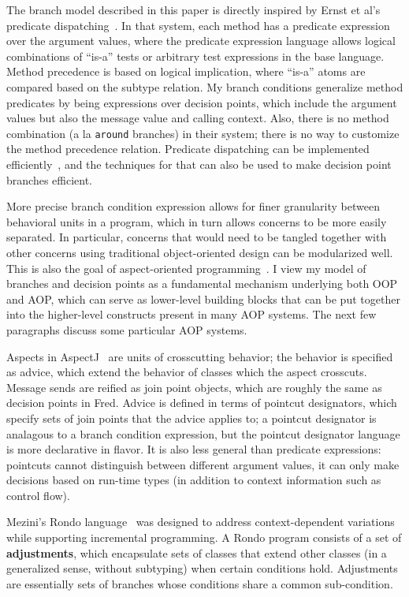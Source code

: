 \documentclass{article}
\newcommand{\defn}[1]{\textbf{#1}}
\newcommand{\code}[1]{\texttt{#1}}
\begin{document}
The branch model described in this paper is directly inspired by Ernst
et al's predicate dispatching~\cite{predicate-dispatch}.  In that
system, each method has a predicate expression over the argument
values, where the predicate expression language allows logical
combinations of ``is-a'' tests or arbitrary test expressions in the
base language.  Method precedence is based on logical implication,
where ``is-a'' atoms are compared based on the subtype relation.  My
branch conditions generalize method predicates by being expressions
over decision points, which include the argument values but also the
message value and calling context.  Also, there is no method
combination (a la \code{around} branches) in their system; there is no
way to customize the method precedence relation.  Predicate
dispatching can be implemented efficiently~\cite{efficient-pd}, and
the techniques for that can also be used to make decision point
branches efficient.

More precise branch condition expression allows for finer granularity
between behavioral units in a program, which in turn allows concerns
to be more easily separated.  In particular, concerns that would need
to be tangled together with other concerns using traditional
object-oriented design can be modularized well.  This is also the goal
of aspect-oriented programming~\cite{kiczales97aspectoriented}.  I
view my model of branches and decision points as a fundamental
mechanism underlying both OOP and AOP, which can serve as lower-level
building blocks that can be put together into the higher-level
constructs present in many AOP systems.  The next few paragraphs
discuss some particular AOP systems.

Aspects in AspectJ~\cite{kiczales01overview} are units of crosscutting
behavior; the behavior is specified as advice, which extend the
behavior of classes which the aspect crosscuts.  Message sends are
reified as join point objects, which are roughly the same as decision
points in Fred.  Advice is defined in terms of pointcut designators,
which specify sets of join points that the advice applies to; a
pointcut designator is analagous to a branch condition expression, but
the pointcut designator language is more declarative in flavor.  It is
also less general than predicate expressions: pointcuts cannot
distinguish between different argument values, it can only make
decisions based on run-time types (in addition to context information
such as control flow).

Mezini's Rondo language~\cite{mezini-thesis} was designed to address
context-dependent variations while supporting incremental programming.
A Rondo program consists of a set of \defn{adjustments}, which
encapsulate sets of classes that extend other classes (in a
generalized sense, without subtyping) when certain conditions hold.
Adjustments are essentially sets of branches whose conditions share a
common sub-condition.
\end{document}
